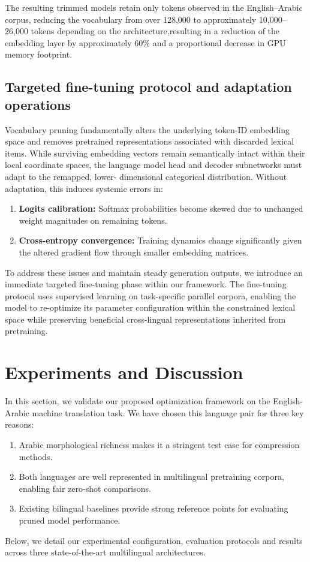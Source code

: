 \documentclass{article}
\begin{document}
	\medskip\noindent
	The resulting trimmed models retain only tokens observed in the English--Arabic
	corpus, reducing the vocabulary from over 128,000 to approximately
	10,000--26,000 tokens depending on the architecture,resulting in a reduction of the
	embedding layer by approximately 60\% and a proportional decrease in GPU memory
	footprint.
	

	\subsection{Targeted fine-tuning protocol and adaptation operations}
	\label{sec:finetuning}
	Vocabulary pruning fundamentally alters the underlying token-ID embedding space and
	removes pretrained representations associated with discarded lexical items. While surviving
	embedding vectors remain semantically intact within their local coordinate spaces, the
	language model head and decoder subnetworks must adapt to the remapped, lower-
	dimensional categorical distribution. Without adaptation, this induces systemic errors in:
	\begin{enumerate}
		\item \textbf{Logits calibration:} Softmax probabilities become skewed due to unchanged weight
		magnitudes on remaining tokens.
		\item \textbf{Cross-entropy convergence:} Training dynamics change significantly given the altered
		gradient flow through smaller embedding matrices.
	\end{enumerate}
	To address these issues and maintain steady generation outputs, we introduce an immediate
	targeted fine-tuning phase within our framework. The fine-tuning protocol uses supervised
	learning on task-specific parallel corpora, enabling the model to re-optimize its parameter
	configuration within the constrained lexical space while preserving beneficial cross-lingual
	representations inherited from pretraining.
	
	\section{Experiments and Discussion}
	\label{sec:results}
	
	In this section, we validate our proposed optimization framework on the English-Arabic
	machine translation task. We have chosen this language pair for three key reasons:
	\begin{enumerate}
		\item Arabic morphological richness makes it a stringent test case for compression methods.
		\item Both languages are well represented in multilingual pretraining corpora, enabling fair
		zero-shot comparisons.
		\item Existing bilingual baselines provide strong reference points for evaluating pruned model
		performance.
	\end{enumerate}
	Below, we detail our experimental configuration, evaluation protocols and results across three
	state-of-the-art multilingual architectures.
	
\end{document}
